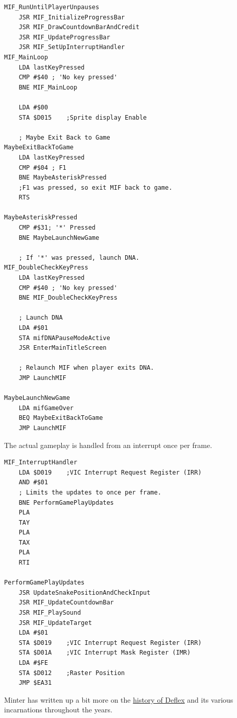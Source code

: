 \begin{lstlisting}
MIF_RunUntilPlayerUnpauses   
    JSR MIF_InitializeProgressBar
    JSR MIF_DrawCountdownBarAndCredit
    JSR MIF_UpdateProgressBar
    JSR MIF_SetUpInterruptHandler
MIF_MainLoop
    LDA lastKeyPressed
    CMP #$40 ; 'No key pressed'
    BNE MIF_MainLoop

    LDA #$00
    STA $D015    ;Sprite display Enable

    ; Maybe Exit Back to Game
MaybeExitBackToGame
    LDA lastKeyPressed
    CMP #$04 ; F1
    BNE MaybeAsteriskPressed
    ;F1 was pressed, so exit MIF back to game.
    RTS 

MaybeAsteriskPressed
    CMP #$31; '*' Pressed
    BNE MaybeLaunchNewGame

    ; If '*' was pressed, launch DNA.
MIF_DoubleCheckKeyPress
    LDA lastKeyPressed
    CMP #$40 ; 'No key pressed'
    BNE MIF_DoubleCheckKeyPress

    ; Launch DNA
    LDA #$01
    STA mifDNAPauseModeActive
    JSR EnterMainTitleScreen

    ; Relaunch MIF when player exits DNA.
    JMP LaunchMIF

MaybeLaunchNewGame
    LDA mifGameOver
    BEQ MaybeExitBackToGame
    JMP LaunchMIF
\end{lstlisting}

The actual gameplay is handled from an interrupt once per frame.

\begin{lstlisting}
MIF_InterruptHandler   
    LDA $D019    ;VIC Interrupt Request Register (IRR)
    AND #$01
    ; Limits the updates to once per frame.
    BNE PerformGamePlayUpdates
    PLA 
    TAY 
    PLA 
    TAX 
    PLA 
    RTI 

PerformGamePlayUpdates
    JSR UpdateSnakePositionAndCheckInput
    JSR MIF_UpdateCountdownBar
    JSR MIF_PlaySound
    JSR MIF_UpdateTarget
    LDA #$01
    STA $D019    ;VIC Interrupt Request Register (IRR)
    STA $D01A    ;VIC Interrupt Mask Register (IMR)
    LDA #$FE
    STA $D012    ;Raster Position
    JMP $EA31
\end{lstlisting}

Minter has written up a bit more on the \href{https://web.archive.org/web/20230811235533/https://stinkygoat.livejournal.com/211183.html}{history of Deflex} and
its various incarnations throughout the years.

